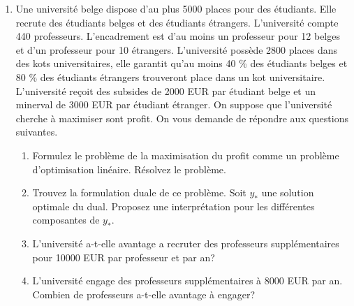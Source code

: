 \begin{enumerate}
\begin{solution}
\begin{itemize}
        \item Si $c < 0$, il n'y a pas de solution vu que
          $x_1\text{, }x_2 \text{, }x_3 \geq 0$.
          Si $0 \leq c < 6$, la solution se situe en $(0, -3)$
          ce qui donne comme coût optimal $3c$.
          Si $c = 6$, tous les points du segment de la droite $2y_1+y_2 = -3$
          entre $(-4/3,-1/3)$ et $(0,-3)$ sont des solutions optimales et
          ils donnent tous $18$ comme coût optimal
          (qui correspond bien à $3c$ aussi).
          Si $6 < c$, le point $(-4/3,-1/3)$ est optimal donc le coût optimal
          est de $12\frac{4}{3}+c\frac{1}{3} = 16+\frac{c}{3}$.

      \end{itemize}
   \end{solution}

  \item  Une université belge dispose d'au plus 5000 places pour des étudiants. Elle recrute des étudiants belges et
    des étudiants étrangers. L'université compte 440 professeurs. L'encadrement est d'au moins un professeur pour 12 belges et d'un professeur pour 10
    étrangers. L'université possède 2800 places dans des kots universitaires, elle garantit  qu'au moins 40 \% des étudiants belges et 80 \% des étudiants
    étrangers trouveront place  dans un kot universitaire. L'université reçoit des subsides de 2000 EUR par étudiant belge et un minerval de 3000 EUR par
    étudiant étranger. On suppose que l'université cherche à maximiser sont profit.  On vous demande de répondre aux questions suivantes.

    \begin{enumerate}
      \item  Formulez le problème de la maximisation du profit comme un problème d'optimisation linéaire. Résolvez le problème.

      \item Trouvez la formulation  duale de ce problème. Soit $y_*$ une solution optimale du dual. Proposez une interprétation pour les
        différentes composantes de
        $y_*$.

      \item   L'université a-t-elle avantage a recruter des professeurs supplémentaires pour 10000 EUR par professeur et par an?

      \item L'université engage des professeurs supplémentaires à 8000 EUR par an. Combien de professeurs a-t-elle avantage \`a engager?


\end{enumerate}
\end{enumerate}
